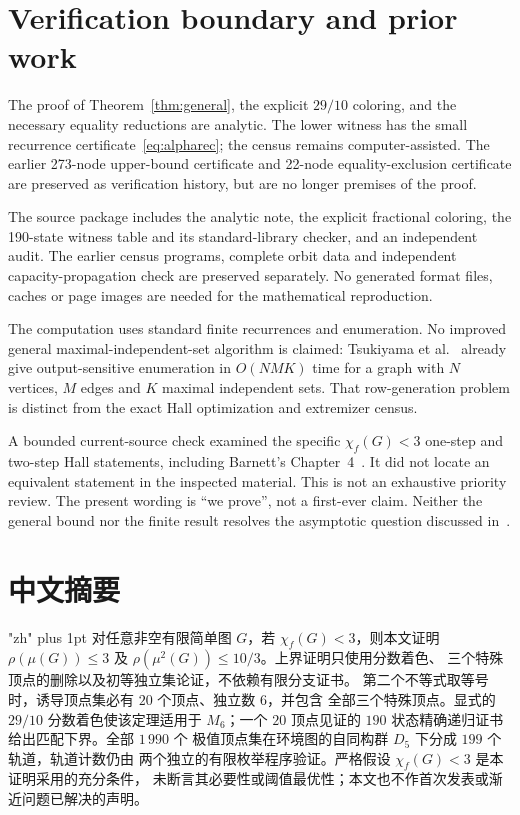 \documentclass[11pt,letterpaper]{article}
\theoremstyle{remark}
\begin{document}
\section{Verification boundary and prior work}
The proof of Theorem~\ref{thm:general}, the explicit $29/10$ coloring, and
the necessary equality reductions are analytic. The lower witness has
the small recurrence certificate~\eqref{eq:alpharec}; the census remains
computer-assisted. The earlier 273-node upper-bound certificate and
22-node equality-exclusion certificate are preserved as verification
history, but are no longer premises of the proof.

The source package includes the analytic note, the explicit fractional
coloring, the 190-state witness table and its standard-library checker,
and an independent audit. The earlier census programs, complete orbit
data and independent capacity-propagation check are preserved separately.
No generated format files, caches or page images are needed for the
mathematical reproduction.

The computation uses standard finite recurrences and enumeration.
No improved general maximal-independent-set algorithm is claimed:
Tsukiyama et al.~\cite{Tsukiyama} already give output-sensitive enumeration
in $O(NMK)$ time for a graph with $N$ vertices, $M$ edges and $K$ maximal
independent sets. That row-generation problem is distinct from the exact
Hall optimization and extremizer census.

A bounded current-source check examined the specific
$\chi_f(G)<3$ one-step and two-step Hall statements, including
Barnett's Chapter~4~\cite{Barnett}. It did not locate an equivalent
statement in the inspected material. This is not an exhaustive priority
review. The present wording is ``we prove'', not a first-ever claim.
Neither the general bound nor the finite result resolves the asymptotic
question discussed in~\cite{Steiner}.

\section*{\chinesefont 中文摘要}
\begingroup\chinesefont
\XeTeXlinebreaklocale "zh"
\XeTeXlinebreakskip=0pt plus 1pt
对任意非空有限简单图 $G$，若 $\chi_f(G)<3$，则本文证明
$\rho(\mu(G))\le3$ 及 $\rho(\mu^2(G))\le10/3$。上界证明只使用分数着色、
三个特殊顶点的删除以及初等独立集论证，不依赖有限分支证书。
第二个不等式取等号时，诱导顶点集必有 $20$ 个顶点、独立数 $6$，并包含
全部三个特殊顶点。显式的 $29/10$ 分数着色使该定理适用于 $M_6$；一个
$20$ 顶点见证的 $190$ 状态精确递归证书给出匹配下界。全部 $1\,990$ 个
极值顶点集在环境图的自同构群 $D_5$ 下分成 $199$ 个轨道，轨道计数仍由
两个独立的有限枚举程序验证。严格假设 $\chi_f(G)<3$ 是本证明采用的充分条件，
未断言其必要性或阈值最优性；本文也不作首次发表或渐近问题已解决的声明。
\endgroup
\end{document}
